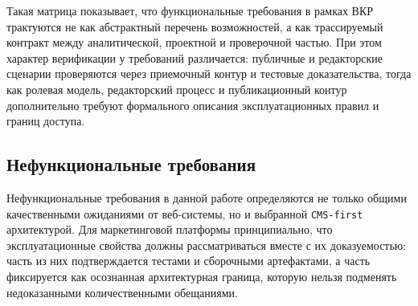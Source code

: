 Такая матрица показывает, что функциональные требования в рамках ВКР трактуются не как
абстрактный перечень возможностей, а как трассируемый контракт между аналитической,
проектной и проверочной частью. При этом характер верификации у требований различается:
публичные и редакторские сценарии проверяются через приемочный контур и тестовые
доказательства, тогда как ролевая модель, редакторский процесс и публикационный контур
дополнительно требуют формального описания эксплуатационных правил и границ доступа.

\subsection{Нефункциональные требования}

Нефункциональные требования в данной работе определяются не только общими качественными
ожиданиями от веб-системы, но и выбранной \texttt{CMS-first} архитектурой. Для
маркетинговой платформы принципиально, что эксплуатационные свойства должны
рассматриваться вместе с их доказуемостью: часть из них подтверждается тестами и
сборочными артефактами, а часть фиксируется как осознанная архитектурная граница,
которую нельзя подменять недоказанными количественными обещаниями.

